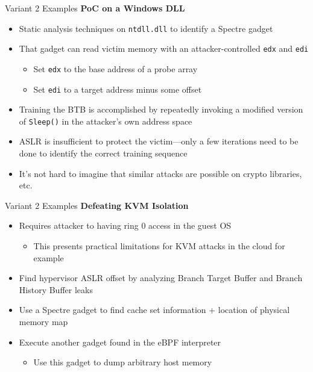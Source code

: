 \documentclass[10pt, dvipsnames, aspectratio=169]{beamer}
\begin{document}
\begin{frame}[c]{Variant 2 Examples}{}
  {\bf PoC on a Windows DLL}
  \begin{itemize}
    \item Static analysis techniques on {\tt ntdll.dll} to identify a Spectre gadget
    \item That gadget can read victim memory with an attacker-controlled \texttt{edx} and \texttt{edi}
    \begin{itemize}
      \item Set {\tt edx} to the base address of a probe array
      \item Set {\tt edi} to a target address minus some offset
    \end{itemize}
    \item Training the BTB is accomplished by repeatedly invoking a modified version of {\tt Sleep()} in the attacker's own address space
    \item ASLR is insufficient to protect the victim---only a few iterations need to be done to identify the correct training sequence
    \item It's not hard to imagine that similar attacks are possible on crypto libraries, etc.
  \end{itemize}
\end{frame}

\begin{frame}[c]{Variant 2 Examples}{}
  {\bf Defeating KVM Isolation}
  \begin{itemize}
    \item Requires attacker to having ring 0 access in the guest OS
    \begin{itemize}
      \item This presents practical limitations for KVM attacks in the cloud for example
    \end{itemize}
    \item Find hypervisor ASLR offset by analyzing Branch Target Buffer and Branch History Buffer leaks
    \item Use a Spectre gadget to find cache set information + location of physical memory map
    \item Execute another gadget found in the eBPF interpreter
    \begin{itemize}
      \item Use this gadget to dump arbitrary host memory
    \end{itemize}
  \end{itemize}
\end{frame}
\end{document}
